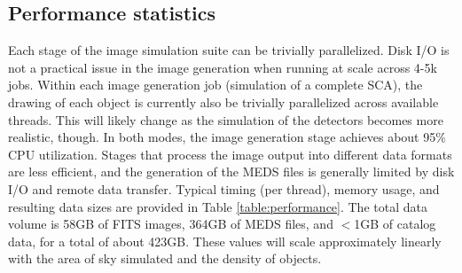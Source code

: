 \documentclass[aps,prd, amsmath,amssymb,superscriptaddress,showkeys,nofootinbib,reprint,preprintnumbers]{revtex4-1}
\begin{document}
\begin{widetext}
\section{Performance statistics}
\label{app:performance}

Each stage of the image simulation suite can be trivially parallelized. Disk I/O is not a practical issue in the image generation when running at scale across 4-5k jobs. Within each image generation job (simulation of a complete SCA), the drawing of each object is currently also be trivially parallelized across available threads. This will likely change as the simulation of the detectors becomes more realistic, though. In both modes, the image generation stage achieves about 95\% CPU utilization. Stages that process the image output into different data formats are less efficient, and the generation of the MEDS files is generally limited by disk I/O and remote data transfer. Typical timing (per thread), memory usage, and resulting data sizes are provided in Table \ref{table:performance}. The total data volume is 58GB of FITS images, 364GB of MEDS files, and $<$1GB of catalog data, for a total of about 423GB. These values will scale approximately linearly with the area of sky simulated and the density of objects.

\begin{table}
\end{table}


\end{widetext}
\end{document}
